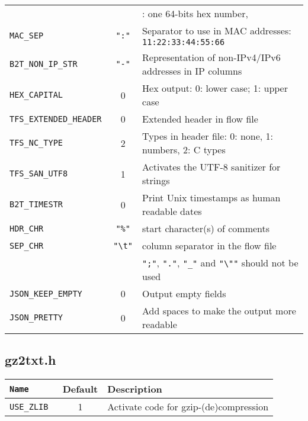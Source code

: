 \begin{longtable}{>{\tt}lcl}
                               &                                 & \qquad 1: one 64-bits hex number,\\
    MAC\_SEP                   & {\tt\small ":"}                 & Separator to use in MAC addresses: {\tt 11:22:33:44:55:66}\\
    B2T\_NON\_IP\_STR          & {\tt\small "-"}                 & Representation of non-IPv4/IPv6 addresses in IP columns\\
    HEX\_CAPITAL               & 0                               & Hex output: 0: lower case; 1: upper case\\
    TFS\_EXTENDED\_HEADER      & 0                               & Extended header in flow file\\
    TFS\_NC\_TYPE              & 2                               & Types in header file: 0: none, 1: numbers, 2: C types\\
    TFS\_SAN\_UTF8             & 1                               & Activates the UTF-8 sanitizer for strings\\
    B2T\_TIMESTR               & 0                               & Print Unix timestamps as human readable dates\\
    HDR\_CHR                   & {\tt\small "\%"}                & start character(s) of comments\\
    SEP\_CHR                   & {\tt\small "\textbackslash{}t"} & column separator in the flow file\\
                               &                                 & {\tt ";"}, {\tt "."}, {\tt "\_"} and {\tt "\textbackslash""} should not be used\\
    JSON\_KEEP\_EMPTY          & 0                               & Output empty fields\\
    JSON\_PRETTY               & 0                               & Add spaces to make the output more readable\\
    \bottomrule
\end{longtable}

\subsection{gz2txt.h}\label{gz2txt.h}
\begin{longtable}{>{\tt}lcl}%
    \toprule
    {\bf Name} & {\bf Default} & {\bf Description}\\%
    \midrule\endhead%
    USE\_ZLIB & 1 & Activate code for gzip-(de)compression\\
    \bottomrule
\end{longtable}

